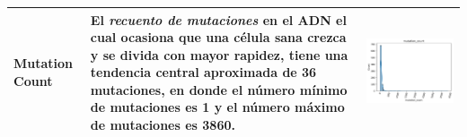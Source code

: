 \begin{table}[!htb]
\begin{threeparttable}
\begin{tabular}{p{2.5cm} p{7cm} p{6.5cm}}
			Mutation Count
			& El \textit{recuento de mutaciones} en el ADN el cual ocasiona que una célula sana  crezca y se divida con mayor rapidez, tiene  una tendencia central aproximada de 36 mutaciones, en donde el número mínimo de mutaciones es 1 y el número máximo de mutaciones es 3860.
			& \begin{center}\includegraphics[width=1\linewidth]{NOTEBOOK/IMAGENES_DESCRIPTIVAS/36_mutation_count}\end{center}
			\\ \hline
			

\end{tabular}
\end{threeparttable}
\end{table}
